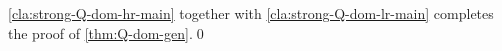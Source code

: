 \documentclass[10pt,a4paper]{article}
\begin{document}
\autoref{cla:strong-Q-dom-hr-main} together with \autoref{cla:strong-Q-dom-lr-main} completes the proof of \autoref{thm:Q-dom-gen}.\qed
\end{document}
